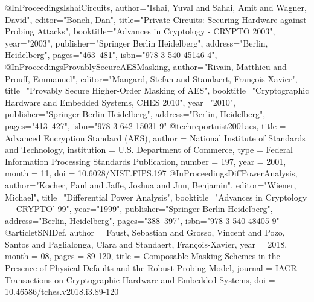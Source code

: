 \documentclass[english, version-2020-11]{uzl-thesis}
\begin{document}
\begin{bibtex-entries}
{  }
  @InProceedings{IshaiCircuits,
    author="Ishai, Yuval and Sahai, Amit and Wagner, David",
    editor="Boneh, Dan",
    title="Private Circuits: Securing Hardware against Probing Attacks",
    booktitle="Advances in Cryptology - CRYPTO 2003",
    year="2003",
    publisher="Springer Berlin Heidelberg",
    address="Berlin, Heidelberg",
    pages="463--481",
    isbn="978-3-540-45146-4",
  }
  @InProceedings{ProvablySecureAESMasking,
    author="Rivain, Matthieu
    and Prouff, Emmanuel",
    editor="Mangard, Stefan
    and Standaert, Fran{\c{c}}ois-Xavier",
    title="Provably Secure Higher-Order Masking of AES",
    booktitle="Cryptographic Hardware and Embedded Systems, CHES 2010",
    year="2010",
    publisher="Springer Berlin Heidelberg",
    address="Berlin, Heidelberg",
    pages="413--427",
    isbn="978-3-642-15031-9"
  }
  @techreport{nist2001aes,
    title       = {Advanced {E}ncryption {S}tandard ({AES})},
    author      = {{National Institute of Standards and Technology}},
    institution = {U.S. Department of Commerce},
    type        = {Federal Information Processing Standards Publication},
    number      = {197},
    year        = {2001},
    month       = {11},
    doi         = {10.6028/NIST.FIPS.197}
  }
  @InProceedings{DiffPowerAnalysis,
    author="Kocher, Paul
    and Jaffe, Joshua
    and Jun, Benjamin",
    editor="Wiener, Michael",
    title="Differential Power Analysis",
    booktitle="Advances in Cryptology --- CRYPTO' 99",
    year="1999",
    publisher="Springer Berlin Heidelberg",
    address="Berlin, Heidelberg",
    pages="388--397",
    isbn="978-3-540-48405-9"
  }
  @article{tSNIDef,
    author = {Faust, Sebastian and Grosso, Vincent and Pozo, Santos and Paglialonga, Clara and Standaert, François-Xavier},
    year = {2018},
    month = {08},
    pages = {89-120},
    title = {Composable Masking Schemes in the Presence of Physical Defaults and the Robust Probing Model},
    journal = {IACR Transactions on Cryptographic Hardware and Embedded Systems},
    doi = {10.46586/tches.v2018.i3.89-120}
  }






   
    

  \end{bibtex-entries}
\end{document}
